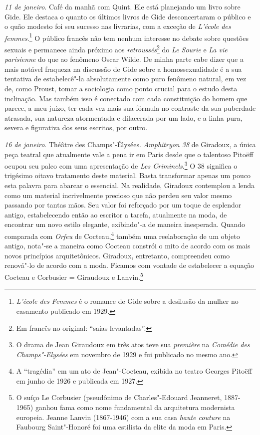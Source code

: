 \emph{11 de janeiro}. Café da manhã com Quint. Ele está planejando um
livro sobre Gide. Ele destaca o quanto os últimos livros de Gide
desconcertaram o público e o quão modesto foi seu sucesso nas livrarias,
com a exceção de \emph{L'école des femmes}.\footnote{\emph{L'école
  des Femmes} é o romance de Gide sobre a desilusão da mulher no
  casamento publicado em 1929. \versal{[N. E.]}} O público francês não tem nenhum
interesse no debate sobre questões sexuais e permanece ainda próximo aos
\emph{retroussés}\footnote{Em francês no original: ``saias levantadas''. \versal{[N. T.]}} do \emph{Le Sourie} e \emph{La vie parisienne} do
que ao fenômeno Oscar Wilde. De minha parte cabe dizer que a mais
notável fraqueza na discussão de Gide sobre a homossexualidade é a sua
tentativa de estabelecê"-la absolutamente como puro fenômeno natural, em
vez de, como Proust, tomar a sociologia como ponto crucial para o estudo
desta inclinação. Mas também isso é conectado com cada constituição do
homem que parece, a meu juízo, ter cada vez mais sua fórmula no
contraste da sua puberdade atrasada, sua natureza atormentada e
dilacerada por um lado, e a linha pura, severa e figurativa dos seus
escritos, por outro.

\emph{16 de janeiro}. Théâtre des Champs"-Élysées. \emph{Amphitryon 38} de
Giradoux, a única peça teatral que atualmente vale a pena ir em Paris
desde que o talentoso Pitoëff ocupou seu palco com uma apresentação de
\emph{Les Criminels}.\footnote{O drama de Jean Giraudoux em três
  atos teve sua \emph{première} na \emph{Comédie des Champs"-Elysées} em
  novembro de 1929 e fui publicado no mesmo ano. \versal{[N. E.]}} O 38 significa o
trigésimo oitavo tratamento deste material. Basta transformar apenas um
pouco esta palavra para abarcar o essencial. Na realidade, Giradoux
contemplou a lenda como um material incrivelmente precioso que não
perdeu seu valor mesmo passando por tantas mãos. Seu valor foi
reforçado por um toque de esplendor antigo, estabelecendo então ao
escritor a tarefa, atualmente na moda, de encontrar um novo estilo
elegante, exibindo"-a de maneira inesperada. Quando comparada com
\emph{Orfeu} de Cocteau,\footnote{A ``tragédia'' em um ato de
  Jean"-Cocteau, exibida no teatro Georges Pitoëff em junho de 1926 e
  publicada em 1927. \versal{[N. E.]}} também uma reelaboração de um objeto antigo,
nota"-se a maneira como Cocteau constrói o mito de acordo com os mais
novos princípios arquitetônicos. Giradoux, entretanto, compreendeu como
renová"-lo de acordo com a moda. Ficamos com vontade de estabelecer a
equação Cocteau e Corbusier = Giraudoux e Lanvin.\footnote{O suíço Le
  Corbusier (pseudônimo de Charles"-Edouard Jeanneret, 1887-1965) ganhou
  fama como nome fundamental da arquitetura modernista europeia. Jeanne
  Lanvin (1867-1946) com a sua casa \emph{haute couture} na Faubourg
  Saint"-Honoré foi uma estilista da elite da moda em Paris. \versal{[N. E.]}}

